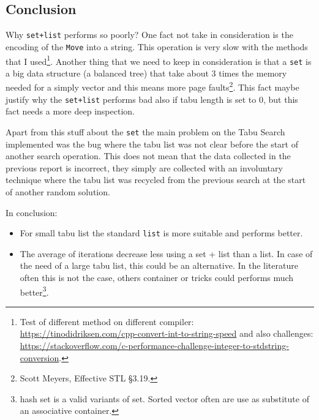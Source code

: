 \subsection{Conclusion}
	Why \verb|set+list| performs so poorly? One fact not take in consideration is the encoding of the \verb|Move| into a string. This operation is very slow with the methods that I used\footnote{Test of different method on different compiler: \\ \href{https://tinodidriksen.com/2010/02/cpp-convert-int-to-string-speed/}{https://tinodidriksen.com/cpp-convert-int-to-string-speed} and also challenges: \\ \href{https://stackoverflow.com/questions/4351371/c-performance-challenge-integer-to-stdstring-conversion}{https://stackoverflow.com/c-performance-challenge-integer-to-stdstring-conversion}.}. 
	Another thing that we need to keep in consideration is that a \verb|set| is a big data structure (a balanced tree) that take about 3 times the memory needed for a simply vector and this means more page faults\footnote{Scott Meyers, Effective STL §3.19.}. This fact maybe justify why the \verb|set+list| performs bad also if tabu length is set to 0, but this fact needs a more deep inspection.
	
	Apart from this stuff about the \verb|set| the main problem on the Tabu Search implemented was the bug where the tabu list was not clear before the start of another search operation. This does not mean that the data collected in the previous report is incorrect, they simply are collected with an involuntary technique where the tabu list was recycled from the previous search at the start of another random solution. 
	
	In conclusion:
	\begin{itemize}
		\item For small tabu list the standard \verb|list| is more suitable and performs better.
		\item The average of iterations decrease less using a set + list than a list. In case of the need of a large tabu list, this could be an alternative. In the literature often this is not the case, others container or tricks could performs much better\footnote{hash set is a valid variants of set. Sorted vector often are use as substitute of an associative container.}.
	\end{itemize}
	
